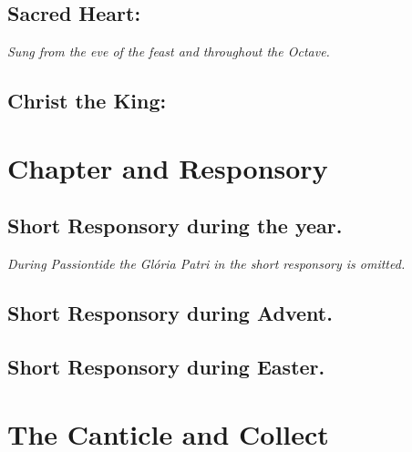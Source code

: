 \documentclass[a5paper,11pt,twoside,openany]{memoir}
\newcommand\rubrics[1]{\textit{#1}}
\begin{document}

\section{Sacred Heart:}

\rubrics{Sung from the eve of the feast and throughout the Octave.}


\section{Christ the King:}


\chapter{Chapter and Responsory}


\section{Short Responsory during the year.}



\rubrics{During Passiontide the \emph{Glória Patri} in the short responsory is omitted.}

\section{Short Responsory during Advent.}




\section{Short Responsory during Easter.}




\chapter{The Canticle and Collect}
\end{document}
